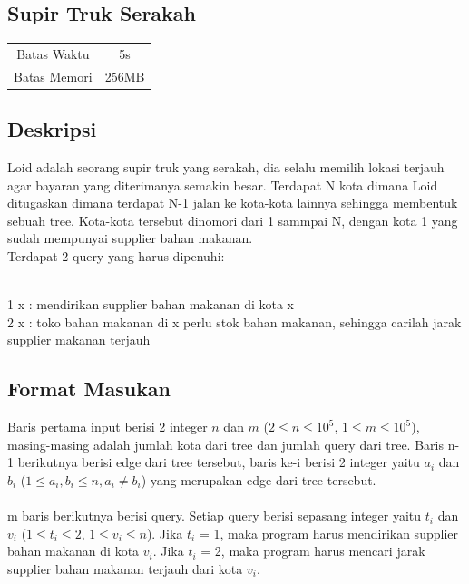 \documentclass{article}
\begin{document}
\begin{center}

    
    \section*{Supir Truk Serakah} %

    \begin{tabular}{ | c c | }
        \hline
        Batas Waktu  & 5s \\    %
        Batas Memori & 256MB \\  %
        \hline
    \end{tabular}
\end{center}

\subsection*{Deskripsi}
Loid adalah seorang supir truk yang serakah, dia selalu memilih lokasi terjauh agar bayaran yang diterimanya semakin besar. Terdapat N kota dimana Loid ditugaskan dimana terdapat N-1 jalan ke kota-kota lainnya sehingga membentuk sebuah tree. Kota-kota tersebut dinomori dari 1 sammpai N, dengan kota 1 yang sudah mempunyai supplier bahan makanan. \\
Terdapat 2 query yang harus dipenuhi:

\\ 1 x : mendirikan supplier bahan makanan di kota x
\\ 2 x : toko bahan makanan di x perlu stok bahan makanan, sehingga carilah jarak supplier makanan terjauh


\subsection*{Format Masukan}
Baris pertama  input berisi 2 integer $n$ dan $m$ ($2 \leq n \leq 10^5$, $1 \leq m \leq 10^5$), masing-masing adalah jumlah kota dari tree dan jumlah query dari tree. Baris n-1 berikutnya berisi edge dari tree tersebut, baris ke-i berisi 2 integer yaitu $a_i$ dan $b_i$ ($1 \leq a_i, b_i \leq n, a_i \neq b_i$) yang merupakan edge dari tree tersebut.
\\
\\
m baris berikutnya berisi query. Setiap query berisi sepasang integer yaitu $t_i$ dan $v_i$ ($1 \leq t_i \leq 2$, $1 \leq v_i \leq n$). Jika $t_i$ = 1, maka program harus mendirikan supplier bahan makanan di kota $v_i$. Jika $t_i$ = 2, maka program harus mencari jarak supplier bahan makanan terjauh dari kota $v_i$.
\end{document}
